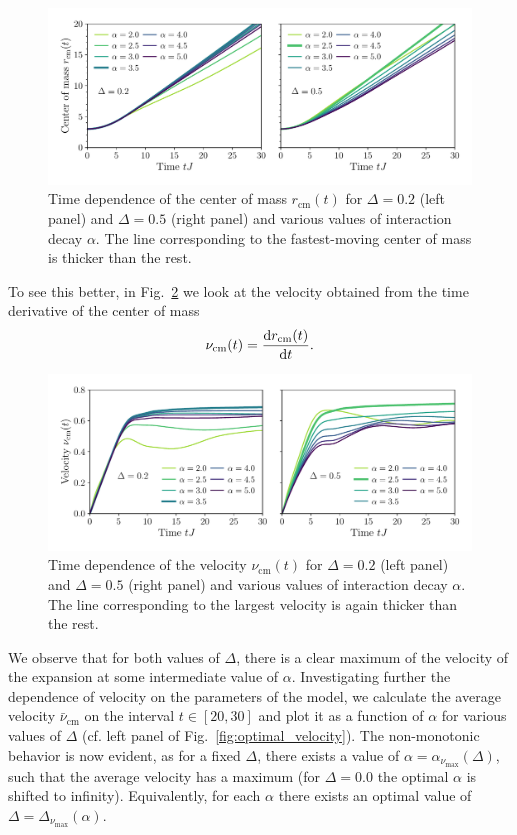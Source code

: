 \begin{figure}[htbp]
  \centering
  \includegraphics[width=\linewidth]{Figures/center_of_mass.pdf}
  \caption{Time dependence of the center of mass \(r_{\text{cm}}(t)\) for \(\Delta = 0.2\) (left panel) and \(\Delta = 0.5\)
  (right panel) and various values of interaction decay \(\alpha\). The line corresponding to the fastest-moving center of mass
  is thicker than the rest.}
  \label{fig:center_of_mass}
\end{figure}

To see this better, in Fig.~\ref{fig:velocity} we look at the velocity
obtained from the time derivative of the center of mass
\begin{equation}
  {\nu}_{\text{cm}}(t) = \dv{r_{\text{cm}}(t)}{t}.
  \label{eq:velocity}
\end{equation}
\begin{figure}[htbp]
  \centering
  \includegraphics[width=\linewidth]{Figures/velocity.pdf}
  \caption{Time dependence of the velocity \(\nu_{\text{cm}}(t)\) for \(\Delta = 0.2\) (left panel) and \(\Delta = 0.5\)
  (right panel) and various values of interaction decay \(\alpha\). The line corresponding to the largest velocity
  is again thicker than the rest.}
  \label{fig:velocity}
\end{figure}
We observe that for both values of \(\Delta\), there is a clear maximum of the velocity of the expansion
at some intermediate value of \(\alpha\). Investigating further the dependence of velocity on the parameters
of the model, we calculate the average velocity \(\bar{\nu}_{\text{cm}}\) on the interval \(t\in\left[20,30\right]\)
and plot it as a function of \(\alpha\) for various values of \(\Delta\)
(cf. left panel of Fig.~\ref{fig:optimal_velocity}).
The non-monotonic behavior is now evident, as for a fixed \(\Delta\), there exists a value of 
\( \alpha = \alpha_{\nu_{\mathrm{max}}}(\Delta) \),
such that the average velocity has a maximum (for \(\Delta = 0.0\) the optimal \(\alpha\) is shifted to infinity).
Equivalently, for each \(\alpha\) there exists an optimal value of \(\Delta = \Delta_{\nu_{\mathrm{max}}} (\alpha)\).

